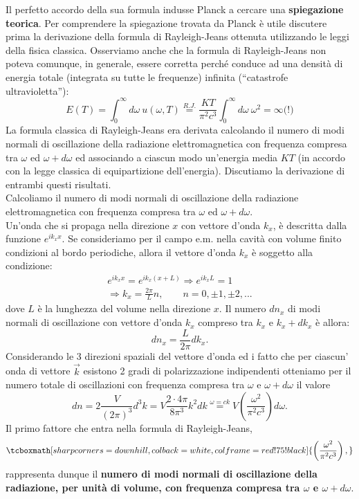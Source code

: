 Il perfetto accordo della sua formula indusse Planck a cercare una \textbf{spiegazione teorica}. Per comprendere la spiegazione trovata da Planck è utile discutere prima la derivazione della formula di Rayleigh-Jeans ottenuta utilizzando le leggi della fisica classica. Osserviamo anche che la formula di  Rayleigh-Jeans non poteva comunque, in generale, essere corretta perché conduce ad una densità di energia totale (integrata su tutte le frequenze) infinita (``catastrofe ultravioletta''):
	\begin{equation}
		E(T) = \int _0 ^\infty d\omega\ u(\omega , T) \overset{R.J.}{=} \frac{KT}{\pi ^2 c ^3}\int _0 ^\infty d\omega \ \omega ^2 = \infty \textrm{(!)}
	\end{equation}
La formula classica di Rayleigh-Jeans era derivata calcolando il numero di modi normali di oscillazione della radiazione elettromagnetica con frequenza compresa tra $\omega$ ed $\omega + d\omega$ ed associando a ciascun modo un'energia media $KT$ (in accordo con la legge classica di equipartizione dell'energia). Discutiamo la derivazione di entrambi questi risultati.\\
Calcoliamo il numero di modi normali di oscillazione della radiazione elettromagnetica con frequenza compresa tra $\omega$ ed $\omega + d\omega$. \\
Un'onda che si propaga nella direzione $x$ con vettore d'onda $k_x$, è descritta dalla funzione $e^{ik_x x}$. Se consideriamo per il campo e.m. nella cavità con volume finito condizioni al bordo periodiche, allora il vettore d'onda $k_x$ è soggetto alla condizione:
	\begin{eqnarray}
		e^{ik_x x}= e^{ik_x (x+L)} \Rightarrow e^{ik_x L}=1  \nonumber\\ \Rightarrow k_x=\frac{2\pi}{L}n, \qquad n= 0, \pm 1, \pm 2,...
	\end{eqnarray}
dove $L$ è la lunghezza del volume nella direzione $x$. Il numero $dn_x$ di modi normali di oscillazione con vettore d'onda $k_x$ compreso tra $k_x$ e $k_x+dk_x$ è allora:
	\begin{equation}
		dn_x =\frac{L}{2\pi}dk_x.
	\end{equation}
Considerando le 3 direzioni spaziali del vettore d'onda ed i fatto che per ciascun' onda di vettore $\vec{k}$ esistono 2 gradi di polarizzazione indipendenti otteniamo per il numero totale di oscillazioni con frequenza compresa tra $\omega$ e $\omega + d\omega$ il valore
	\begin{equation}
		dn =2\frac{V}{(2\pi)^3}d^3k= V \frac{2\cdot 4\pi}{8\pi ^3} k^2 dk \overset{\omega =ck}{=} V \left( \frac{\omega ^2}{\pi ^2 c^3}\right) d\omega .
	\end{equation}
Il primo fattore che entra nella formula di Rayleigh-Jeans,
	\begin{equation}
		\tcboxmath[sharp corners=downhill ,colback=white,colframe=red!75!black]{
			\left( \frac{\omega ^2}{\pi ^2 c^3} \right) ,
		}
		\label{eq:cap1_1}
	\end{equation}
rappresenta dunque il \textbf{numero di modi normali di oscillazione della radiazione, per unità di volume, con frequenza compresa tra $\omega$ e $\omega + d\omega$}.\\

